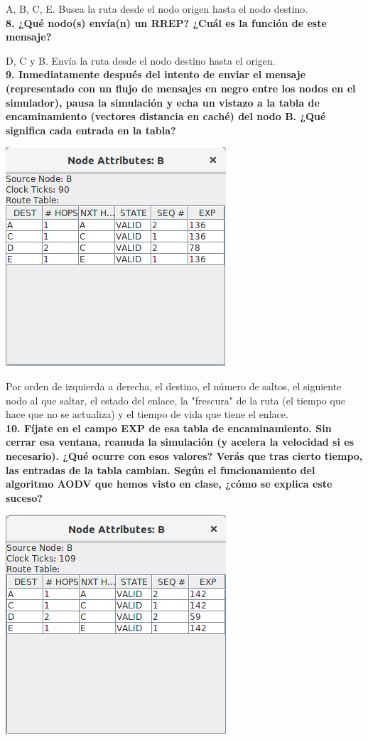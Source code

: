 \documentclass{article}
\begin{document}
A, B, C, E. Busca la ruta desde el nodo origen hasta el nodo destino.\\

\textbf{8. ¿Qué nodo(s) envía(n) un RREP? ¿Cuál es la función de este mensaje?}

D, C y B. Envía la ruta desde el nodo destino hasta el origen.\\

\textbf{9. Inmediatamente después del intento de enviar el mensaje (representado con un flujo
de mensajes en negro entre los nodos en el simulador), pausa la simulación y echa un
vistazo a la tabla de encaminamiento (vectores distancia en caché) del nodo B. ¿Qué
significa cada entrada en la tabla?}

\begin{center}
\includegraphics[scale=0.5]{nodob.png}
\end{center}

Por orden de izquierda a derecha, el destino, el número de saltos, el siguiente nodo al que saltar, el estado del enlace, la "frescura" de la ruta (el tiempo que hace que no se actualiza) y el tiempo de vida que tiene el enlace.\\

\textbf{10. Fíjate en el campo EXP de esa tabla de encaminamiento. Sin cerrar esa ventana,
reanuda la simulación (y acelera la velocidad si es necesario). ¿Qué ocurre con esos
valores? Verás que tras cierto tiempo, las entradas de la tabla cambian. Según el funcionamiento del algoritmo AODV que hemos visto en clase, ¿cómo se explica este
suceso?}

\begin{center}
\includegraphics[scale=0.5]{nodeb2.png}
\end{center}
\end{document}
